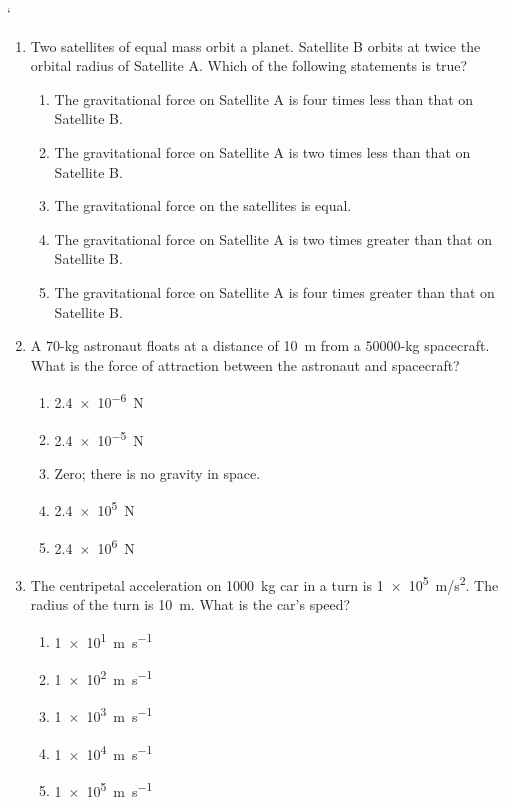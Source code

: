 \documentclass{../../oss-apphys}
\begin{document}
\genheader

`

\genmultidirections

\gengravity

\raggedcolumns
\begin{multicols}{2}

  \begin{enumerate}[leftmargin=18pt]  
  \item Two satellites of equal mass orbit a planet. Satellite B orbits at twice
    the orbital radius of Satellite A. Which of the following statements is
    true?
    \begin{enumerate}[noitemsep,topsep=0pt,leftmargin=18pt,label=(\Alph*)]
    \item The gravitational force on Satellite A is four times less than that on
      Satellite B.
    \item The gravitational force on Satellite A is two times less than that on
      Satellite B.
    \item The gravitational force on the satellites is equal.
    \item The gravitational force on Satellite A is two times greater than that
      on Satellite B.
    \item The gravitational force on Satellite A is four times greater than that
      on Satellite B.
    \end{enumerate}
    
  \item A $70$-\si{\kilo\gram} astronaut floats at a distance of \SI{10}{\metre}
    from a $50000$-\si{\kilo\gram} spacecraft. What is the force of attraction
    between the astronaut and spacecraft?
    \begin{enumerate}[noitemsep,topsep=0pt,leftmargin=18pt,label=(\Alph*)]
    \item\SI{2.4e-6}{\newton}
    \item\SI{2.4e-5}{\newton}
    \item Zero; there is no gravity in space.
    \item\SI{2.4e5}{\newton}
    \item\SI{2.4e6}{\newton}
    \end{enumerate}
    
  \item The centripetal acceleration on \SI{1000}{\kilo\gram} car in a turn is
    \SI{1e5}{m/s^2}. The radius of the turn is \SI{10}{\metre}. What is the
    car's speed?
    \begin{enumerate}[noitemsep,topsep=0pt,leftmargin=18pt,label=(\Alph*)]
    \item\SI{1e1}{\metre\per\second}
    \item\SI{1e2}{\metre\per\second}
    \item\SI{1e3}{\metre\per\second}
    \item\SI{1e4}{\metre\per\second}
    \item\SI{1e5}{\metre\per\second}
    \end{enumerate}


\end{enumerate}
\end{multicols}
\end{document}
